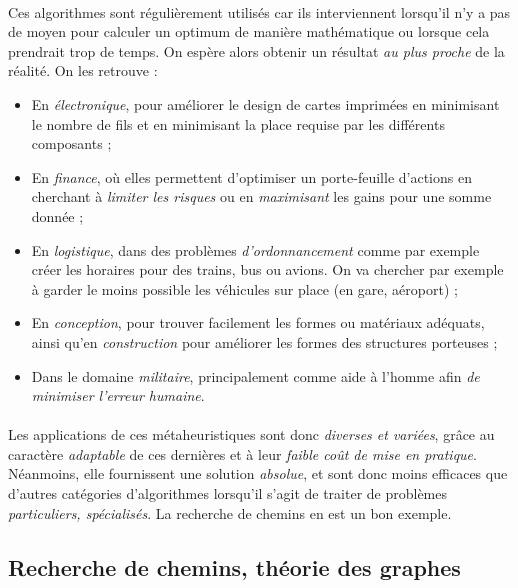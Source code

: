 \paragraph{} Ces algorithmes sont régulièrement utilisés car ils interviennent lorsqu'il n'y a pas de moyen pour 
calculer un optimum de manière mathématique ou lorsque cela prendrait trop de temps. On espère alors obtenir un
résultat \emph{au plus proche} de la réalité. On les retrouve :
\begin{itemize}
    \item En \emph{électronique}, pour améliorer le design de cartes imprimées en minimisant le nombre de fils et 
    en minimisant la place requise par les différents composants ;
    \item En \emph{finance}, où elles permettent d'optimiser un porte-feuille d'actions en cherchant à \emph{limiter
    les risques} ou en \emph{maximisant} les gains pour une somme donnée ;
    \item En \emph{logistique}, dans des problèmes \emph{d'ordonnancement} comme par exemple créer les horaires pour
    des trains, bus ou avions. On va chercher par exemple à garder le moins possible les véhicules sur place (en gare, 
    aéroport) ;
    \item En \emph{conception}, pour trouver facilement les formes ou matériaux adéquats, ainsi qu'en \emph{construction}
    pour améliorer les formes des structures porteuses ;
    \item Dans le domaine \emph{militaire}, principalement comme aide à l'homme afin \emph{de minimiser l'erreur
    humaine}. 
\end{itemize}

\paragraph{} Les applications de ces métaheuristiques sont donc \emph{diverses et variées}, grâce au caractère \emph{
adaptable} de ces dernières et à leur \emph{faible coût de mise en pratique}. Néanmoins, elle fournissent une
solution \emph{absolue}, et sont donc moins efficaces que d'autres catégories d'algorithmes lorsqu'il s'agit de traiter
de problèmes \emph{particuliers, spécialisés}. La recherche de chemins en est un bon exemple. 


\subsection*{Recherche de chemins, théorie des graphes}

